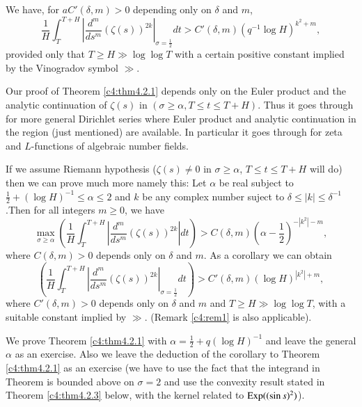 \begin{coro*}
We have, for $a C'(\delta, m) > 0$ depending only on $\delta$ and $m$,
$$
\frac{1}{H} \int^{T+H}_T |\frac{d^m}{ds^m}(\zeta(s))^{2k}|_{\sigma =\frac{1}{2}} dt > C' (\delta, m) (q^{-1} \log H)^{k^2 + m}, 
$$
provided only that $T \geq H \gg \log \log T$ with a certain positive constant implied by the Vinogradov symbol $\gg$.
\end{coro*}

\setcounter{remark}{0}
\begin{remark}\label{c4:rem1}
Our proof of Theorem \ref{c4:thm4.2.1} depends only on the Euler product and the analytic continuation of $\zeta(s)$ in $(\sigma \geq \alpha, T \leq t \leq T + H)$. Thus it goes through for more general Dirichlet series where Euler product and analytic continuation in the region (just mentioned) are available. In particular it goes through for zeta and $L$-functions of algebraic number fields.
\end{remark}


\begin{remark}\label{c4:rem2}
If we assume Riemann hypothesis ($\zeta(s) \neq 0$ in $\sigma \geq \alpha$, $T \leq t \leq T + H$ will do) then we can prove much more namely this: Let $\alpha$ be real subject to $\frac{1}{2} + (\log H)^{-1} \leq \alpha \leq 2$ and $k$ be any complex number suject to $\delta \leq | k| \leq \delta^{-1}$.\pageoriginale Then for all integers $m\geq 0$, we have
$$
\max\limits_{\sigma \geq \alpha}  \left( \frac{1}{H} \int^{T+H}_T |\frac{d^m}{ds^m} (\zeta(s))^{2k}|dt\right) > C (\delta, m) \left( \alpha -\frac{1}{2}\right)^{-|k^2|-m},
$$
where $C(\delta, m) > 0$ depends only on $\delta$ and $m$. As a corollary we can obtain
$$
\left(\frac{1}{H} \int^{T+H}_T |\frac{d^m}{ds^m} (\zeta(s))^{2k}|_{\sigma =\frac{1}{2}} dt \right) > C' (\delta, m) (\log H)^{|k^2|+m},
$$
where $C'(\delta, m) > 0$ depends only on $\delta$ and $m$ and $T \geq H \gg \log \log T$, with a suitable constant implied by $\gg$. (Remark \ref{c4:rem1} is also applicable).
\end{remark}

We prove Theorem \ref{c4:thm4.2.1} with $\alpha =\frac{1}{2} + q (\log H)^{-1}$ and leave the general $\alpha$ as an exercise. Also we leave the deduction of the corollary to Theorem \ref{c4:thm4.2.1} as an exercise (we have to use the fact that the integrand in Theorem is bounded above on $\sigma =2$ and use the convexity result stated in Theorem \ref{c4:thm4.2.3} below, with the kernel related to $\operatorname{Exp} ((\sin s)^2)$).

